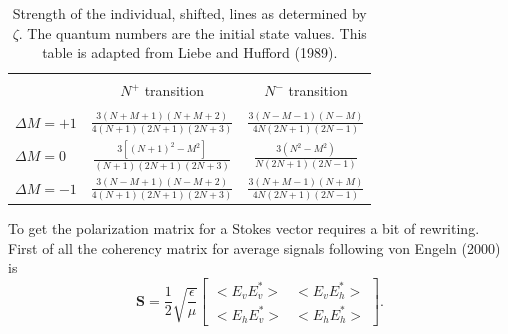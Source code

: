 \begin{table}[ht!]
 \centering
\begin{minipage}{254.1pt}
  \begin{tabular}{l|cc}
    \hline\\[-5pt]
    &$N^{+}$ transition&$N^{-}$ transition\\[5pt]\hline\\[-5pt]
    $\Delta M = +1$	&$\frac{3(N+M+1)( N+M+2 )}{4( N+1 )( 2N+1 )( 2N+3 ) }$
		        &$\frac{3( N-M-1 ) ( N-M ) }{ 4 N ( 2N+1 )( 2N-1 ) }$\\[10pt]
    $\Delta M =  0$	&$\frac{3  \left[(N+1)^2  - M^2 \right]}{ ( N+1 )  ( 2N+1 )  ( 2N+3 ) }$
			&$\frac{3 ( N^2 - M^2 )}{ N  ( 2N+1 )  ( 2N-1 ) }$\\[10pt]
    $\Delta M = -1$	&$\frac{3 ( N-M+1 )  ( N-M+2 ) }{ 4 ( N+1 )  ( 2N+1 )  ( 2N+3 )}$
			&$\frac{3 ( N+M-1 ) ( N+M )}{ 4 N  ( 2N+1 )  ( 2N-1 ) }$
    \\[5pt]\hline
  \end{tabular}
\caption{Strength of the individual, shifted, lines as determined by $\zeta$.
The quantum numbers are the initial state values. This table is adapted from Liebe and Hufford (1989).}
\label{tab:zeta}
\end{minipage}
\end{table}

To get the polarization matrix for a Stokes vector requires a bit of rewriting. First of all the coherency matrix for average signals following von Engeln (2000) is
\begin{equation}
 \mathbf{S} = \frac{1}{2}\sqrt{\frac{\epsilon}{\mu}} \left[
\begin{array}{cc}
 <E_v E_v^\ast>&<E_v E_h^\ast>\\
 <E_h E_v^\ast>&<E_h E_h^\ast>
\end{array}
\right].
\end{equation}

